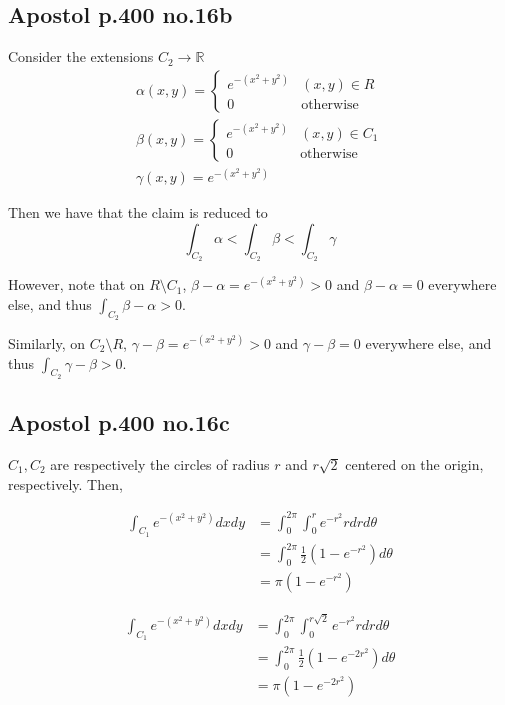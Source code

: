 \documentclass[12pt,letterpaper]{article}
\theoremstyle{definition}
\newcommand{\R}{\mathbb{R}}
\begin{document}
\subsection*{Apostol p.400 no.16b}

Consider the extensions $C_2 \rightarrow \R$
\begin{gather*}
  \alpha(x,y) =
  \begin{cases}
    e^{-(x^2+y^2)} & (x,y) \in R \\
    0 & \text{otherwise}
  \end{cases} \\
  \beta(x,y) =
  \begin{cases}
    e^{-(x^2+y^2)} & (x,y) \in C_1 \\
    0 & \text{otherwise}
  \end{cases} \\
  \gamma(x,y) = e^{-(x^2+y^2)}
\end{gather*}

Then we have that the claim is reduced to
\[
  \int_{C_2}\alpha < \int_{C_2} \beta < \int_{C_2} \gamma
\]

However, note that on $R \setminus C_1$, $\beta - \alpha = e^{-(x^2+y^2)} > 0$
and $\beta - \alpha = 0$ everywhere else, and thus $\int_{C_2}\beta - \alpha >
0$.

Similarly, on $C_2 \setminus R$, $\gamma - \beta = e^{-(x^2+y^2)} > 0$
and $\gamma - \beta = 0$ everywhere else, and thus $\int_{C_2}\gamma - \beta >
0$.


\subsection*{Apostol p.400 no.16c}

$C_1, C_2$ are respectively the circles of radius $r$ and $r\sqrt{2}$ centered
on the origin, respectively. Then,

\begin{align*}
  \int_{C_1}e^{-(x^2+y^2)}dxdy &= \int_0^{2\pi}\int_0^re^{-r^2}rdrd\theta \\
                               &= \int_0^{2\pi} \frac{1}{2}(1 -e^{-r^2}) d\theta \\
                               &= \pi(1-e^{-r^2})
\end{align*}

\begin{align*}
  \int_{C_1}e^{-(x^2+y^2)}dxdy &= \int_0^{2\pi}\int_0^{r\sqrt{2}}e^{-r^2}rdrd\theta \\
                               &= \int_0^{2\pi} \frac{1}{2}(1 -e^{-2r^2}) d\theta \\
                               &= \pi(1-e^{-2r^2})
\end{align*}
\end{document}
